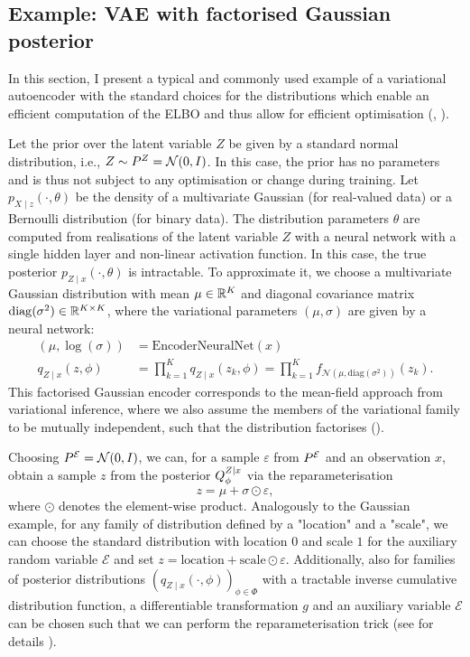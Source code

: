 \subsection{Example: VAE with factorised Gaussian posterior}\label{sec:VAE-example_Gaussian_posterior}

In this section, I present a typical and commonly used example of a variational autoencoder with the standard choices for the distributions which enable an efficient computation of the ELBO and thus allow for efficient optimisation (\cite[pp.~24f.]{Kingma2019}, \cite[p.~5]{Kingma2013}). 

Let the prior over the latent variable $Z$ be given by a standard normal distribution, i.e., $Z\sim \P^Z = \mathcal{N}(0,I)$. In this case, the prior has no parameters and is thus not subject to any optimisation or change during training. Let $p_{X\mid z}(\cdot,\theta)$ be the density of a multivariate Gaussian (for real-valued data) or a Bernoulli distribution (for binary data). The distribution parameters $\theta$ are computed from realisations of the latent variable $Z$ with a neural network with a single hidden layer and non-linear activation function. 
In this case, the true posterior $p_{Z\mid x}(\cdot,\theta)$ is intractable. To approximate it, we choose a multivariate Gaussian distribution with mean $\mu \in \R^K$ and diagonal covariance matrix $\mathrm{diag}(\sigma^2)\in \R^{K\times K}$, where the variational parameters $(\mu, \sigma)$ are given by a neural network: 
\begin{equation}
\begin{split}
	(\mu, \log(\sigma)) &= \mathrm{EncoderNeuralNet}(x) \\
	q_{Z\mid x}(z,\phi) &= \prod_{k=1}^K q_{Z\mid x}(z_k,\phi) = \prod_{k=1}^K f_{\mathcal{N}(\mu,\mathrm{diag}(\sigma^2))}(z_k).
\end{split}
\end{equation}
This factorised Gaussian encoder corresponds to the mean-field approach from variational inference, where we also assume the members of the variational family to be mutually independent, such that the distribution factorises (\cite[pp.~7-10]{Blei}).

Choosing $\P^{\mathcal{E}} = \mathcal{N}(0,I)$, we can, for a sample $\varepsilon$ from $\P^{\mathcal{E}}$ and an observation $x$, obtain a sample $z$ from the posterior $\Q_{\phi}^{Z\mid x}$ via the reparameterisation 
$$
	z = \mu + \sigma \odot \varepsilon, 
$$
where $\odot$ denotes the element-wise product. Analogously to the Gaussian example, for any family of distribution defined by a "location" and a "scale", we can choose the standard distribution with location $0$ and scale $1$ for the auxiliary random variable $\mathcal{E}$ and set $z = \mathrm{location} + \mathrm{scale} \odot \varepsilon$. Additionally, also for families of posterior distributions $\left(q_{Z\mid x}(\cdot, \phi)\right)_{\phi\in\Phi}$ with a tractable inverse cumulative distribution function, a differentiable transformation $g$ and an auxiliary variable $\mathcal{E}$ can be chosen such that we can perform the reparameterisation trick (see for details \cite[p.~5]{Kingma2013}).

